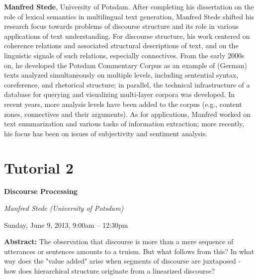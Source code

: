 \begin{bio}
\noindent
{\bfseries Manfred Stede}, University of Potsdam. After completing his dissertation on the role of lexical semantics in multilingual text generation, Manfred Stede shifted his research focus towards problems of discourse structure and its role in various applications of text understanding. For discourse structure, his work centered on coherence relations and associated structural descriptions of text, and on the linguistic signals of such relations, especially connectives. From the early 2000s on, he developed the Potsdam Commentary Corpus as an example of (German) texts analyzed simultaneously on multiple levels, including sentential syntax, coreference, and rhetorical structure; in parallel, the technical infrastructure of a database for querying and visualizing multi-layer corpora was developed. In recent years, more analysis levels have been added to the corpus (e.g., content zones, connectives and their arguments). As for applications, Manfred worked on text summarization and various tasks of information extraction; more recently, his focus has been on issues of subjectivity and sentiment analysis.
\end{bio}

\section%
    [\textbf{T2:} Discourse Processing (M. Stede)]
    {Tutorial 2}
\label{TutV}
\begin{center}
\begin{Large}
\bfseries Discourse Processing\\ \vspace{2em}\par
\end{Large}

{\itshape Manfred Stede (University of Potsdam)}\vspace{1em}\par
Sunday, June 9, 2013, 9:00am -- 12:30pm \vspace{1em}\\
\TutLocB
\end{center}

\noindent
{\bfseries Abstract:} The observation that discourse is more than a mere sequence of utterances or sentences amounts to a truism. But what follows from this? In what way does the "value added" arise when segments of discourse are juxtaposed - how does hierarchical structure originate from a linearized discourse?

